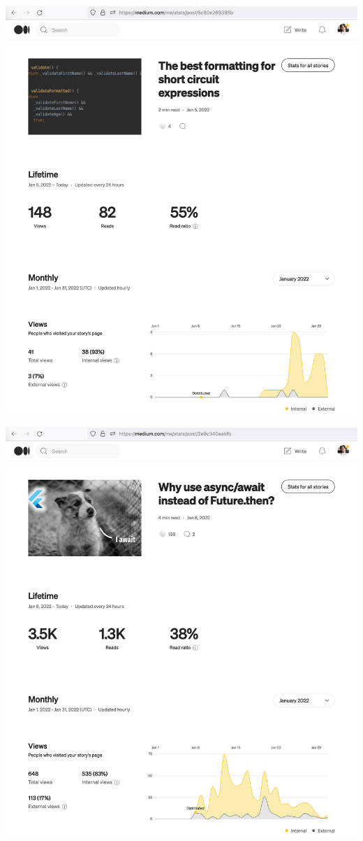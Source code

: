 \begin{center}
    \includegraphics[width=\textwidth]{2022-01-05_formatting}
\end{center}
\pagebreak

\begin{center}
    \includegraphics[width=\textwidth]{2022-01-08_await}
\end{center}
\pagebreak


